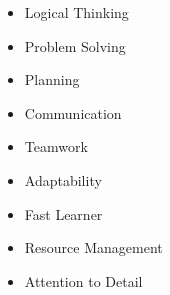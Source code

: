 \documentclass[11pt,a4paper]{article}
\begin{document}
\noindent
\begin{minipage}[t]{0.32\textwidth}
	\begin{itemize}[leftmargin=*,nosep]
		\item Logical Thinking
		\item Problem Solving
		\item Planning
	\end{itemize}
\end{minipage}
\hfill
\begin{minipage}[t]{0.32\textwidth}
	\begin{itemize}[leftmargin=*,nosep]
		\item Communication
		\item Teamwork
		\item Adaptability
	\end{itemize}
\end{minipage}
\hfill
\begin{minipage}[t]{0.32\textwidth}
	\begin{itemize}[leftmargin=*,nosep]
		\item Fast Learner
		\item Resource Management
		\item Attention to Detail
	\end{itemize}
\end{minipage}
\end{document}
